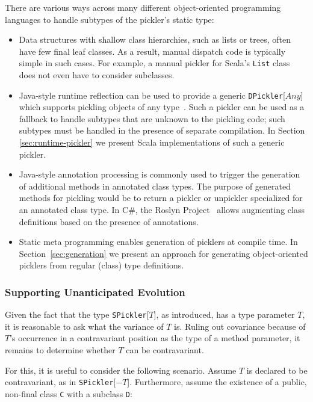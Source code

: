 \documentclass[preprint,10pt]{sigplanconf}
\theoremstyle{definition}
\theoremstyle{definition}
\newcommand{\term}[1]{\mbox{\texttt{#1}}}
\begin{document}
There are various ways across many different object-oriented programming
languages to handle subtypes of the pickler's static type:

\begin{itemize}
\item Data structures with shallow class hierarchies, such as lists or trees,
often have few final leaf classes. As a result, manual dispatch code is
typically simple in such cases. For example, a manual pickler for Scala's
\term{List} class does not even have to consider subclasses.

\item Java-style runtime reflection can be used to provide a generic
\term{DPickler}[$Any$] which supports pickling objects of any
type~\cite{JavaSerialization,Philippsen2000}. Such a pickler can be used as a
fallback to handle subtypes that are unknown to the pickling code; such
subtypes must be handled in the presence of separate compilation. In
Section \ref{sec:runtime-pickler} we present Scala implementations of such a
generic pickler.

\item Java-style annotation processing is commonly used to trigger the
generation of additional methods in annotated class types. The purpose of
generated methods for pickling would be to return a pickler or unpickler
specialized for an annotated class type. In C\#, the Roslyn
Project~\cite{Roslyn} allows augmenting class definitions based on the
presence of annotations.

\item Static meta programming \cite{Burmako2012,Nemerle} enables generation of
picklers at compile time. In Section~\ref{sec:generation} we present an
approach for generating object-oriented picklers from regular (class) type
definitions.
\end{itemize}


\subsubsection{Supporting Unanticipated Evolution}\label{sec:unanticipated}

Given the fact that the type \term{SPickler}[$T$], as introduced, has a type
parameter $T$, it is reasonable to ask what the variance of $T$ is. Ruling out
covariance because of $T$'s occurrence in a contravariant position as the type
of a method parameter, it remains to determine whether $T$ can be
contravariant.

For this, it is useful to consider the following scenario. Assume $T$ is
declared to be contravariant, as in \term{SPickler}[$-T$]. Furthermore, assume
the existence of a public, non-final class \term{C} with a subclass \term{D}:
\end{document}
